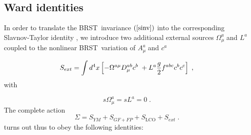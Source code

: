 \documentclass[a4paper,12pt]{article}
\begin{document}
\subsection{Ward identities}

In order to translate the BRST\ invariance $\left( \ref{sinv}\right) $ into
the corresponding Slavnov-Taylor identity \cite{book}, we introduce two
additional external sources $\Omega _{\mu }^{a}\;$and $L^{a}\;$coupled to
the nonlinear BRST\ variation of $A_{\mu }^{a}\;$and $c^{a}$

\begin{equation}
S_{ext}=\int d^{4}x\left[ -\Omega ^{a\mu }D_{\mu }^{ab}c^{b}\;+L^{a}\frac{g}{%
2}f^{abc}c^{b}c^{c}\right] \;,  \label{om}
\end{equation}
with

\[
s\Omega _{\mu }^{a}=sL^{a}=0\;. 
\]
The complete action 
\begin{equation}
\Sigma =S_{YM}+S_{GF+FP}+S_{\mathrm{LCO}}+S_{ext}\;.  \label{sl}
\end{equation}
turns out thus to obey the following identities:
\end{document}
